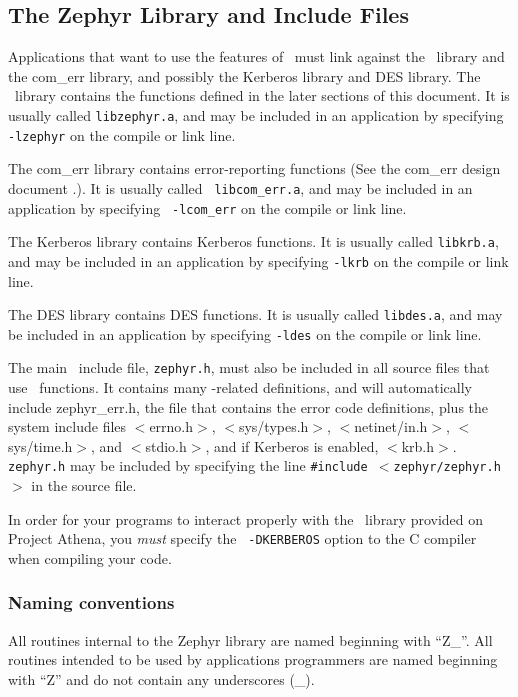 %
\subsection{The Zephyr Library and Include Files}
\label{library-include}

Applications that want to use the features of \Zephyr\ must link
against the \Zephyr\ library and the com_err library, and possibly the
Kerberos library and DES library.  The \Zephyr\ library contains the functions
defined in the later sections of this document.  It is usually called
{\tt libzephyr.a}, and may be included in an application by specifying
{\tt -lzephyr} on the compile or link line.  

The com_err library contains error-reporting functions (See the com_err
design document \cite{comerr-paper}.).  It is usually called {\tt
libcom_err.a}, and may be included in an application by specifying {\tt
-lcom_err} on the compile or link line.

The Kerberos library contains Kerberos functions.  It is usually called
{\tt libkrb.a}, and may be included in an application by specifying
{\tt -lkrb} on the compile or link line.

The DES library contains DES functions.  It is usually called
{\tt libdes.a}, and may be included in an application by specifying
{\tt -ldes} on the compile or link line.

The main \Zephyr\ include file, {\tt zephyr.h}, must also be included
in all source files that use \Zephyr\ functions.  It contains many
\Zephyr-related definitions, and will automatically include
zephyr_err.h, the file that contains the error code definitions, plus
the system include files $<$errno.h$>$, $<$sys/types.h$>$,
$<$netinet/in.h$>$, $<$sys/time.h$>$, and $<$stdio.h$>$, and if Kerberos
is enabled, $<$krb.h$>$.
{\tt zephyr.h} may be included by specifying the line {\tt \#include
$<$zephyr/zephyr.h$>$} in the source file.

In order for your programs to interact properly with the \Zephyr\
library provided on Project Athena, you {\em must\/} specify the {\tt
-DKERBEROS} option to the C compiler when compiling your code.

\subsubsection{Naming conventions}
\label{naming-conventions}
All routines internal to the Zephyr library are named beginning with
``Z_''.  All routines intended to be used by applications programmers are
named beginning with ``Z'' and do not contain any underscores (_).
